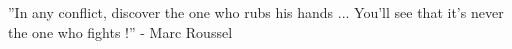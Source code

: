 ''In any conflict, discover the one who rubs his hands ... You'll see that it's never the one who fights !''  - Marc Roussel
